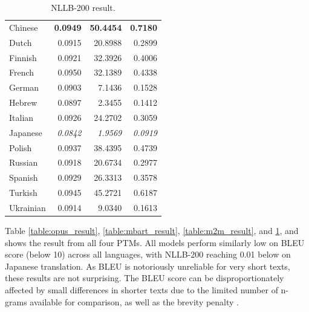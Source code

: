 \documentclass[a4paper, 11pt]{article}
\begin{document}
\begin{table}[htbp]
\begin{minipage}{0.49\linewidth}
\begin{tabular}{lrrr}
            \hline
            Chinese           & \textbf{0.0949} & \textbf{50.4454}   & \textbf{0.7180} \\
            Dutch             & 0.0915          & 20.8988            & 0.2899          \\
            Finnish           & 0.0921          & 32.3926            & 0.4006          \\
            French            & 0.0950          & 32.1389            & 0.4338          \\
            German            & 0.0903          & 7.1436             & 0.1528          \\
            Hebrew            & 0.0897          & 2.3455             & 0.1412          \\
            Italian           & 0.0926          & 24.2702            & 0.3059          \\
            Japanese          & \textit{0.0842} & \textit{1.9569}    & \textit{0.0919} \\
            Polish            & 0.0937          & 38.4395            & 0.4739          \\
            Russian           & 0.0918          & 20.6734            & 0.2977          \\
            Spanish           & 0.0929          & 26.3313            & 0.3578          \\
            Turkish           & 0.0945          & 45.2721            & 0.6187          \\
            Ukrainian         & 0.0914          & 9.0340             & 0.1613          \\
            \hline
        \end{tabular}
        \caption{NLLB-200 result.}
        \label{table:nllb_result}
    \end{minipage}
\end{table}

Table \ref{table:opus_result}, \ref{table:mbart_result}, \ref{table:m2m_result}, and \ref{table:nllb_result}, and  shows the result from all four PTMs. All models perform similarly low on BLEU score (below 10) across all languages, with NLLB-200 reaching 0.01 below on Japanese translation. As BLEU is notoriously unreliable for very short texts, these results are not surprising. The BLEU score can be disproportionately affected by small differences in shorter texts due to the limited number of n-grams available for comparison, as well as the brevity penalty \cite{chatgpt-2024-bleu,papieni-2002-bleu}.
\end{document}
